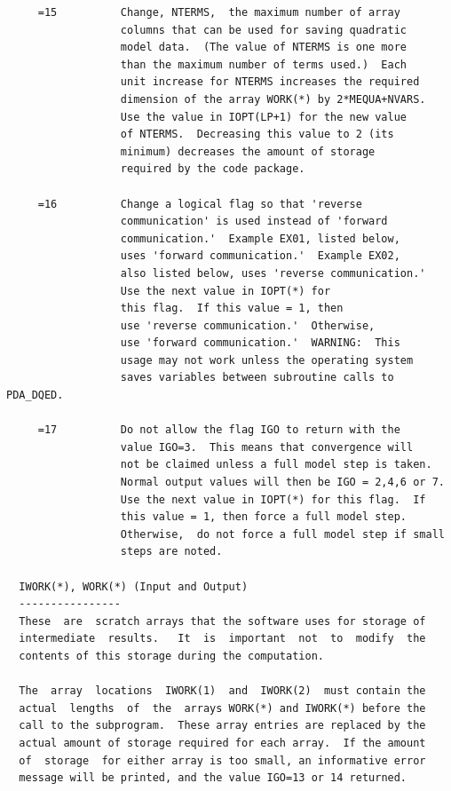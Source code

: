 \documentclass[11pt,twoside]{article}
\begin{document}
\begin{verbatim}
     =15          Change, NTERMS,  the maximum number of array
                  columns that can be used for saving quadratic
                  model data.  (The value of NTERMS is one more
                  than the maximum number of terms used.)  Each
                  unit increase for NTERMS increases the required
                  dimension of the array WORK(*) by 2*MEQUA+NVARS.
                  Use the value in IOPT(LP+1) for the new value
                  of NTERMS.  Decreasing this value to 2 (its
                  minimum) decreases the amount of storage
                  required by the code package.

     =16          Change a logical flag so that 'reverse
                  communication' is used instead of 'forward
                  communication.'  Example EX01, listed below,
                  uses 'forward communication.'  Example EX02,
                  also listed below, uses 'reverse communication.'
                  Use the next value in IOPT(*) for
                  this flag.  If this value = 1, then
                  use 'reverse communication.'  Otherwise,
                  use 'forward communication.'  WARNING:  This
                  usage may not work unless the operating system
                  saves variables between subroutine calls to PDA_DQED.

     =17          Do not allow the flag IGO to return with the
                  value IGO=3.  This means that convergence will
                  not be claimed unless a full model step is taken.
                  Normal output values will then be IGO = 2,4,6 or 7.
                  Use the next value in IOPT(*) for this flag.  If
                  this value = 1, then force a full model step.
                  Otherwise,  do not force a full model step if small
                  steps are noted.

  IWORK(*), WORK(*) (Input and Output)
  ----------------
  These  are  scratch arrays that the software uses for storage of
  intermediate  results.   It  is  important  not  to  modify  the
  contents of this storage during the computation.

  The  array  locations  IWORK(1)  and  IWORK(2)  must contain the
  actual  lengths  of  the  arrays WORK(*) and IWORK(*) before the
  call to the subprogram.  These array entries are replaced by the
  actual amount of storage required for each array.  If the amount
  of  storage  for either array is too small, an informative error
  message will be printed, and the value IGO=13 or 14 returned.


\end{verbatim}
\end{document}
